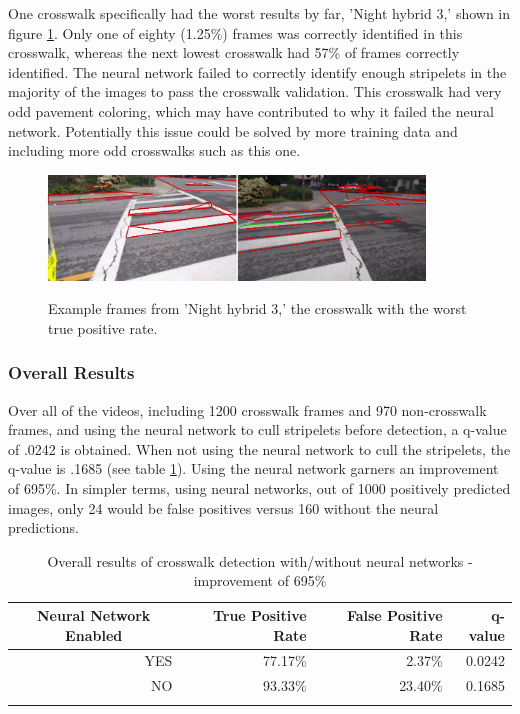 \documentclass[12pt]{ucthesis}
\newcommand{\captionfonts}{\small\bf\ssp}
\begin{document}
One crosswalk specifically had the worst results by far, 'Night hybrid 3,' shown in figure \ref{fig:worstcwalk}. Only one of eighty (1.25\%) frames was correctly identified in this crosswalk, whereas the next lowest crosswalk had 57\% of frames correctly identified. The neural network failed to correctly identify enough stripelets in the majority of the images to pass the crosswalk validation. This crosswalk had very odd pavement coloring, which may have contributed to why it failed the neural network.  Potentially this issue could be solved by more training data and including more odd crosswalks such as this one. 

\begin{figure}[H]
\begin{center}
\includegraphics[width=10cm]{WorstCwalk.png}
\captionfonts
\caption[Examples of worst crosswalk]{Example frames from 'Night hybrid 3,' the crosswalk with the worst true positive rate.}
\label{fig:worstcwalk}
\end{center}
\end{figure}

\subsubsection{Overall Results}
    
Over all of the videos, including 1200 crosswalk frames and 970 non-crosswalk frames, and using the neural network to cull stripelets before detection, a q-value of .0242 is obtained. When not using the neural network to cull the stripelets, the q-value is .1685 (see table \ref{tab:overallresults}). Using the neural network garners an improvement of 695\%. In simpler terms, using neural networks, out of 1000 positively predicted images, only 24 would be false positives versus 160 without the neural predictions. 

\begin{center}
    \begin{longtable}[H]{| r | r | r | r |}
    \hline
    \multicolumn{1}{|c|}{Neural Network Enabled} & True Positive Rate & False Positive Rate & q-value \bigstrut\\
    \hline
    YES & 77.17\% & 2.37\% & 0.0242 \bigstrut\\
    \hline
    NO & 93.33\% & 23.40\% & 0.1685 \bigstrut\\
    \hline

    \caption{Overall results of crosswalk detection with/without neural networks -  improvement of 695\%}
    \label{tab:overallresults} 
    \end{longtable}
\end{center}
\end{document}
